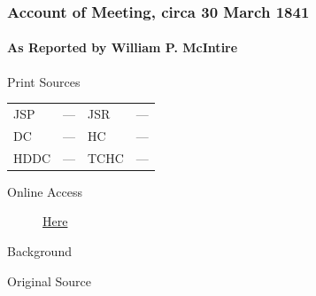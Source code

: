 		\subsubsection{Account of Meeting, circa 30 March 1841}
			\label{EMS-1841-JS-CIR-30-MAR-1841}
			
			\paragraph{As Reported by William P. McIntire}
				\label{EMS-1841-JS-CIR-30-MAR-1841-WM}
			
				\begin{description}
					\item[Print Sources]
				\end{description}

				\begin{tabular}{p{0.5in}p{1in}p{0.5in}p{1in}}
					JSP	 	& ---		& JSR 		& --- \\
					DC	 	& ---		& HC 		& --- \\
					HDDC 	& ---		& TCHC 		& --- \\
				\end{tabular}
				
				\begin{description}
					\item[Online Access] \href{https://www.josephsmithpapers.org/paper-summary/account-of-meeting-circa-30march-1841/1}{Here}
				\end{description}
				
				\begin{description}
					\item[Background]
				\end{description}
				
				
				\begin{description}
					\item[Original Source]
				\end{description}
				
